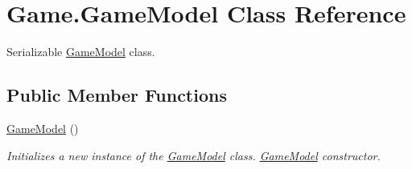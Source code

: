 \hypertarget{class_game_1_1_game_model}{}\section{Game.\+Game\+Model Class Reference}
\label{class_game_1_1_game_model}


Serializable \mbox{\hyperlink{class_game_1_1_game_model}{Game\+Model}} class.  


\subsection*{Public Member Functions}
\begin{DoxyCompactItemize}
\item 
\mbox{\hyperlink{class_game_1_1_game_model_a4fcc812732987f1d24505da1e90de974}{Game\+Model}} ()
\begin{DoxyCompactList}\small\item\em Initializes a new instance of the \mbox{\hyperlink{class_game_1_1_game_model}{Game\+Model}} class. \mbox{\hyperlink{class_game_1_1_game_model}{Game\+Model}} constructor. \end{DoxyCompactList}\end{DoxyCompactItemize}
